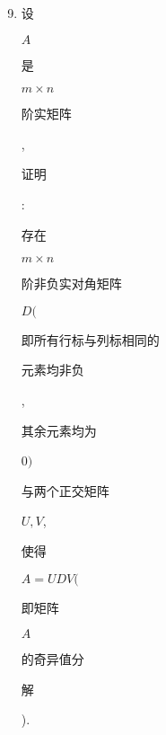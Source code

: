 \documentclass[10pt]{article}
\begin{document}
\begin{enumerate}
  \setcounter{enumi}{8}
  \item \begin{CJK}{UTF8}{mj}设\end{CJK} $A$ \begin{CJK}{UTF8}{mj}是\end{CJK} $m \times n$ \begin{CJK}{UTF8}{mj}阶实矩阵\end{CJK}, \begin{CJK}{UTF8}{mj}证明\end{CJK}: \begin{CJK}{UTF8}{mj}存在\end{CJK} $m \times n$ \begin{CJK}{UTF8}{mj}阶非负实对角矩阵\end{CJK} $D($ \begin{CJK}{UTF8}{mj}即所有行标与列标相同的\end{CJK} \begin{CJK}{UTF8}{mj}元素均非负\end{CJK}, \begin{CJK}{UTF8}{mj}其余元素均为\end{CJK} 0$)$ \begin{CJK}{UTF8}{mj}与两个正交矩阵\end{CJK} $U, V$, \begin{CJK}{UTF8}{mj}使得\end{CJK} $A=U D V($ \begin{CJK}{UTF8}{mj}即矩阵\end{CJK} $A$ \begin{CJK}{UTF8}{mj}的奇异值分\end{CJK} \begin{CJK}{UTF8}{mj}解\end{CJK}).


\end{enumerate}
\end{document}
